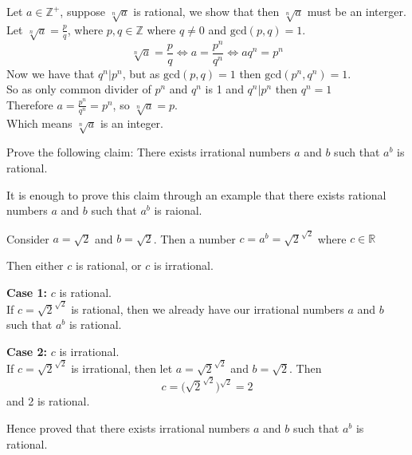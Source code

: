 \documentclass[addpoints]{exam}
\newenvironment{problem}[2][Problem]{\begin{trivlist}
    \item[\hskip \labelsep {\bfseries #1}\hskip \labelsep {\bfseries #2.}]}{\end{trivlist}}
\begin{document}
\begin{sloppypar}
\begin{questions}
\begin{solution}
        Let $a \in \mathbb{Z}^+$, suppose $\sqrt[n]{a}$ is rational, we show that then $\sqrt[n]{a}$ must be an interger.
        \\Let $\sqrt[n]{a} = \frac{p}{q}$, where $p,q \in \mathbb{Z}$ where $q \neq 0$ and $\text{gcd}(p,q) = 1$.
        $$\sqrt[n]{a} = \frac{p}{q} \Leftrightarrow a = \frac{p^n}{q^n} \Leftrightarrow a q^n = p^n$$
        Now we have that $q^n | p^n$, but as $\text{gcd}(p,q) = 1$ then $\text{gcd}(p^n,q^n) = 1$.
        \\So as only common divider of $p^n$ and $q^n$ is 1 and $q^n | p^n$ then $q^n = 1$
        \\Therefore $ a = \frac{p^n}{q^n} = p^n$, so $\sqrt[n]{a} = p$.
        \\Which means $\sqrt[n]{a}$ is an integer.
        \end{solution}
    \end{questions}
    \pagebreak
    \begin{problem}{11}
    Prove the following claim: There exists irrational numbers $a$ and $b$ such that $a^b$ is rational.
    \end{problem}

    \begin{questions}
        \question
        \begin{solution}
            
            It is enough to prove this claim through an example that there exists rational numbers $a$ and $b$ such that $a^b$ is raional. 

            Consider $a = \sqrt{2}$ and $ b = \sqrt{2} $. Then a number $ c = a^b = \sqrt{2}^{\sqrt{2}} $ where $ c \in \mathbb{R} $

            Then either $ c $ is rational, or $c$ is irrational. 

            \textbf{Case 1:} $c$ is rational. \\ 
            If $ c = \sqrt{2}^{\sqrt{2}} $ is rational, then we already have our irrational numbers $a$ and $b$ such that $ a^b $ is rational.
            
            \textbf{Case 2:} $c$ is irrational. \\ 
            If $c = \sqrt{2}^{\sqrt{2}} $ is irrational, then let $ a = \sqrt{2}^{\sqrt{2}} $ and $ b = \sqrt{2} $. Then $$ c = \biggl( \sqrt{2}^{\sqrt{2}} \biggr)^{\sqrt{2}} = 2$$
            and 2 is rational.

            Hence proved that there exists irrational numbers $a$ and $b$ such that $ a^b $ is rational.
        \end{solution}
    \end{questions}


\end{sloppypar}
\end{document}
